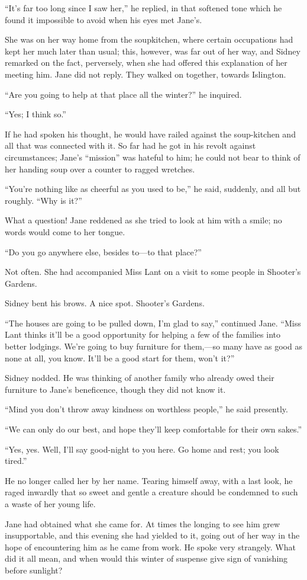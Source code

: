 ``It's far too long since I saw her,'' he replied, in that softened tone
which he found it impossible to avoid when his eyes met Jane's.

She was on her way home from the soupkitchen, where certain occupations
had kept her much later than usual; this, however, was far out of her
way, and Sidney remarked on the fact, perversely, when she had offered
this explanation of her meeting him. Jane did not reply. They walked on
together, towards Islington.

``Are you going to help at that place all the winter?'' he inquired.

{}``Yes; I think so.''

If he had spoken his thought, he would have railed against the
soup-kitchen and all that was connected with it. So far had he got in
his revolt against circumstances; Jane's ``mission'' was hateful to him;
he could not bear to think of her handing soup over a counter to ragged
wretches.

``You're nothing like as cheerful as you used to be,'' he said,
suddenly, and all but roughly. ``Why is it?''

What a question! Jane reddened as she tried to look at him with a smile;
no words would come to her tongue.

``Do you go anywhere else, besides to---to that place?''

Not often. She had accompanied Miss Lant on a visit to some people in
Shooter's Gardens.

Sidney bent his brows. A nice spot. Shooter's Gardens.

``The houses are going to be pulled down, I'm glad to say,'' continued
Jane. ``Miss Lant thinks it'll be a good opportunity for helping a few
of the families into better lodgings. We're going to buy furniture for
them,---so many have as good as none at all, you {}know. It'll be a good
start for them, won't it?''

Sidney nodded. He was thinking of another family who already owed their
furniture to Jane's beneficence, though they did not know it.

``Mind you don't throw away kindness on worthless people,'' he said
presently.

``We can only do our best, and hope they'll keep comfortable for their
own sakes.''

``Yes, yes. Well, I'll say good-night to you here. Go home and rest; you
look tired.''

He no longer called her by her name. Tearing himself away, with a last
look, he raged inwardly that so sweet and gentle a creature should be
condemned to such a waste of her young life.

Jane had obtained what she came for. At times the longing to see him
grew insupportable, and this evening she had yielded to it, going out of
her way in the hope of encountering him as he came from work. He spoke
very strangely. What did it all mean, and when would this winter of
suspense give sign of vanishing before sunlight?
